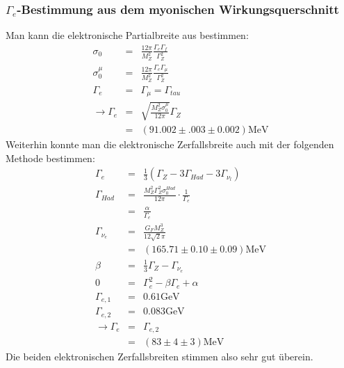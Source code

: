 \subsubsection{$\Gamma_e$-Bestimmung aus dem myonischen Wirkungsquerschnitt}
Man kann die elektronische Partialbreite aus \cite[Gl.5]{script} bestimmen:
\begin{eqnarray}
 \sigma_0 &=& \frac{12\pi}{M_Z^2}\frac{\Gamma_e\Gamma_f}{\Gamma_Z^2}\\
 \sigma_0^{\mu} &=& \frac{12\pi}{M_Z^2}\frac{\Gamma_e\Gamma_{\mu}}{\Gamma_Z^2}\\
 \Gamma_e &=& \Gamma_{\mu} = \Gamma_{tau}\\
 \rightarrow \Gamma_e &=& \sqrt{\frac{M_Z^2\sigma_0^{\mu}}{12\pi}}\Gamma_Z\\
 &=& (91.002 \pm .003 \pm 0.002)\si{\mega\electronvolt}				%
\end{eqnarray}
Weiterhin konnte man die elektronische Zerfallsbreite auch mit der folgenden Methode bestimmen:
\begin{eqnarray}
\Gamma_e &=& \frac{1}{3}(\Gamma_Z - 3\Gamma_{Had} - 3\Gamma_{\nu_l})\\
\Gamma_{Had} &=& \frac{M_Z^2\Gamma_Z^2\sigma_0^{Had}}{12\pi}\cdot\frac{1}{\Gamma_e}\\
&=& \frac{\alpha}{\Gamma_e}\\
\Gamma_{\nu_e} &=& \frac{G_FM_Z^3}{12\sqrt{2}\pi}\\
&=& (165.71 \pm 0.10 \pm 0.09)\si{\mega\electronvolt}\\
\beta &=& \frac{1}{3}\Gamma_Z - \Gamma_{\nu_e}\\
0 &=& \Gamma_e^2 - \beta\Gamma_e + \alpha\\
\Gamma_{e,1} &=& 0.61\si{\giga\electronvolt}\\
\Gamma_{e,2} &=& 0.083\si{\giga\electronvolt}\\
\rightarrow \Gamma_e &=& \Gamma_{e,2}\\
&=& (83 \pm 4 \pm 3) \si{\mega\electronvolt}
\end{eqnarray}
Die beiden elektronischen Zerfallsbreiten stimmen also sehr gut überein.